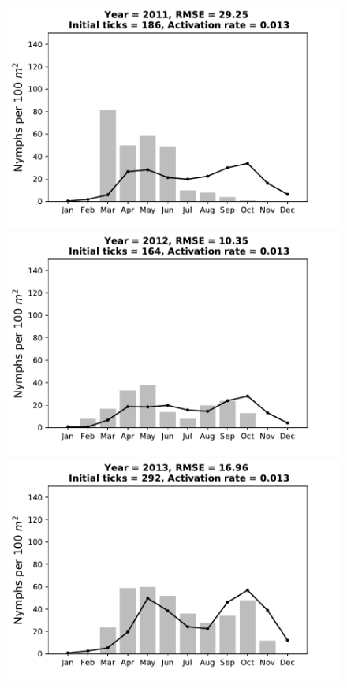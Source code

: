 \documentclass[a4paper, 11pt]{scrartcl}
\begin{document}
\begin{figure}[h!]
\begin{minipage}[c]{0.40\linewidth}
\includegraphics[width=\linewidth]{figures/s5/S5_2011}
\end{minipage}
\begin{minipage}[c]{0.40\linewidth}
\includegraphics[width=\linewidth]{figures/s5/S5_2012}
\end{minipage}
\begin{minipage}[c]{0.40\linewidth}
\includegraphics[width=\linewidth]{figures/s5/S5_2013}

\end{minipage}
\end{figure}
\end{document}

